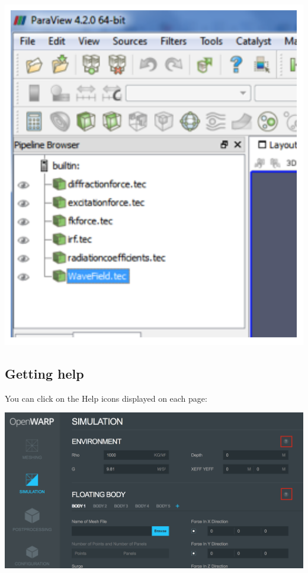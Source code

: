 \documentclass[12pt]{article}
\begin{document}
\vspace{\abovedisplayskip}
\begin{minipage}{\linewidth}
	\centering
	\includegraphics[scale=0.5]{img/38}
\end{minipage}
\vspace{\belowdisplayskip}

\subsection{Getting help}

You can click on the Help icons displayed on each page:

\vspace{\abovedisplayskip}
\begin{minipage}{\linewidth}
	\centering
	\includegraphics[scale=0.4]{img/39}
\end{minipage}
\vspace{\belowdisplayskip}
\end{document}
